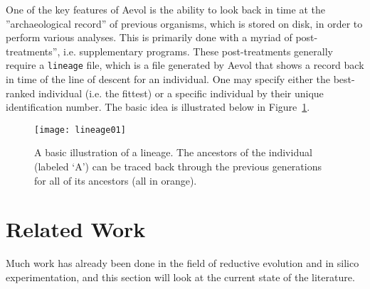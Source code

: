 One of the key features of Aevol is the ability to look back in time at the ''archaeological record'' of previous organisms, which is stored on disk, in order to perform various analyses. This is primarily done with a myriad of post-treatments'', i.e. supplementary programs. These post-treatments generally require a \texttt{lineage} file, which is a file generated by Aevol that shows a record back in time of the line of descent for an individual. One may specify either the best-ranked individual (i.e. the fittest) or a specific individual by their unique identification number. The basic idea is illustrated below in Figure~\ref{fig:lineage01}. 

\begin{figure}[H]
	\texttt{[image: lineage01]}
	\centering
	\caption[Lineage basic illustration.]{A basic illustration of a lineage. The ancestors of the individual (labeled `A') can be traced back through the previous generations for all of its ancestors (all in orange).}
	\label{fig:lineage01}
\end{figure}


\section{Related Work}\label{related_work}


Much work has already been done in the field of reductive evolution and in silico experimentation, and this section will look at the current state of the literature. 

